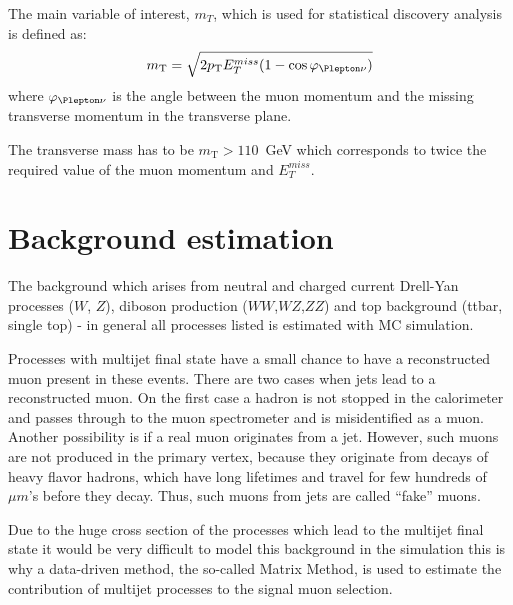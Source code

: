 
The main variable of interest, $m_T$, which is used for statistical discovery analysis is defined as:
\begin{equation}
 m_\mathrm{T} = \sqrt{2 p_\mathrm{T} E_T^{miss} (1-\cos\varphi_{\Plepton\nu})}
\end{equation}
where $\varphi_{\Plepton\nu}$ is the angle between the muon momentum and the missing transverse momentum in the transverse plane.

The transverse mass has to be $m_\mathrm{T} > 110$~GeV which corresponds to twice the required  value of the muon
momentum and $E_T^{miss}$.


\section{Background estimation}
\label{sec:wprime_backgroundEstimation}

The background which arises from neutral and charged current Drell-Yan processes ($W$, $Z$), diboson production ($WW$,$WZ$,$ZZ$) and top background  (ttbar, single top) - in general all processes listed  is estimated with MC simulation.

Processes with multijet final state have a small chance 
to have a reconstructed muon present in these events.
There are two cases when jets lead to a reconstructed muon. 
On the first case a hadron is not stopped in the calorimeter and passes through to the muon spectrometer and is misidentified as a muon. Another possibility is if a real muon originates from a jet. However, such muons are not produced in the primary vertex, because they originate from decays of heavy flavor hadrons, which have long lifetimes and travel for few hundreds of $\mu m$'s before they decay.
Thus, such muons from jets are called ``fake'' muons.

Due to the huge cross section of the processes which lead to the multijet final state 
it would be very difficult to model this background in the simulation
this is why a data-driven method,
the so-called Matrix Method, is used to estimate the contribution of multijet processes to the signal muon selection.

